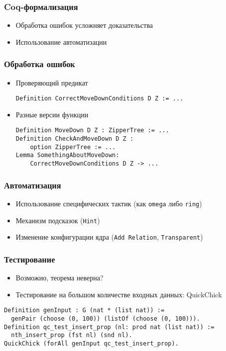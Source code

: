 \documentclass{beamer}
\begin{document}
\begin{frame}
\frametitle{Coq-формализация}
\begin{itemize}
\item Обработка ошибок усложняет доказательства
\item Использование автоматизации
\end{itemize}
\end{frame}

\begin{frame}[fragile]
\frametitle{Обработка ошибок}
\begin{itemize}
\item Проверяющий предикат
\begin{verbatim}
Definition CorrectMoveDownConditions D Z := ...
\end{verbatim}
\item Разные версии функции
\begin{verbatim}
Definition MoveDown D Z : ZipperTree := ...
Definition CheckAndMoveDown D Z :
    option ZipperTree := ...
Lemma SomethingAboutMoveDown:
    CorrectMoveDownConditions D Z -> ...
\end{verbatim}
\end{itemize}
\end{frame}

\begin{frame}
\frametitle{Автоматизация}
\begin{itemize}
\item Использование специфических тактик (как \texttt{omega} либо \texttt{ring})
\item Механизм подсказок (\texttt{Hint})
\item Изменение конфигурации ядра (\texttt{Add Relation}, \texttt{Transparent})
\end{itemize}
\end{frame}

\begin{frame}[fragile]
\frametitle{Тестирование}
\begin{itemize}
\item Возможно, теорема неверна?
\item Тестирование на большом количестве входных данных: QuickChick
\end{itemize}
\begin{verbatim}
Definition genInput : G (nat * (list nat)) :=
  genPair (choose (0, 100)) (listOf (choose (0, 100))).
Definition qc_test_insert_prop (nl: prod nat (list nat)) :=
  nth_insert_prop (fst nl) (snd nl).
QuickChick (forAll genInput qc_test_insert_prop).
\end{verbatim}
\end{frame}
\end{document}
